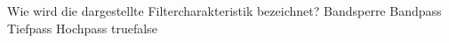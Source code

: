    {Wie wird die dargestellte Filtercharakteristik bezeichnet?}
    {Bandsperre}
    {Bandpass}
    {Tiefpass}
    {Hochpass}
    {true}{false}